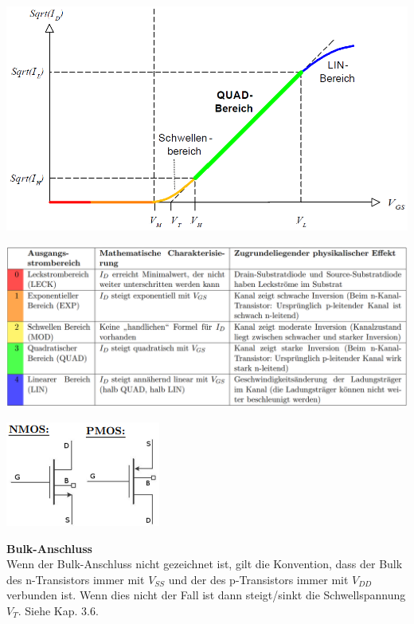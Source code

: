 \begin{minipage}{0.33\linewidth}
\includegraphics[width=1\linewidth]{Transferkennline_Sqrt.png}
\end{minipage}\newpage
\begin{minipage}{0.8\linewidth}
\includegraphics[width=1\linewidth]{Ausgangsstrombereiech.png}
\end{minipage}%
\begin{minipage}{0.2\linewidth}
\includegraphics[angle=90, width=0.8\linewidth]{Selbstsperrend MOS-Transistor.png}
\end{minipage}
\textbf{Bulk-Anschluss}\\
Wenn der Bulk-Anschluss nicht gezeichnet ist, gilt die Konvention, dass der Bulk des n-Transistors immer mit $V_{SS}$ und der des p-Transistors immer mit $V_{DD}$ verbunden ist. Wenn dies nicht der Fall ist dann steigt/sinkt die Schwellspannung $V_T$. Siehe Kap. 3.6.
